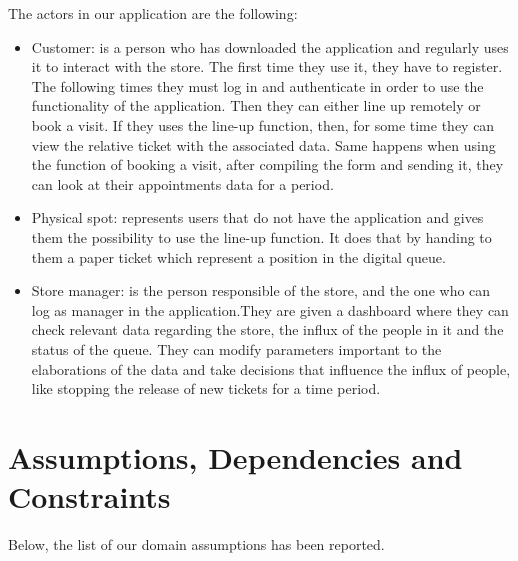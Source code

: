 The actors in our application are the following:

\begin{itemize}

	\item Customer: is a person who has downloaded the application and regularly uses it to interact with the store. The first time they use it, they have to register. The following times they must log in and authenticate in order to use the functionality of the application. Then they can either line up remotely or book a visit. If they uses the line-up function, then, for some time they can view the relative ticket with the associated data. Same happens
	when using the function of booking a visit, after compiling the form and sending it, they can look at their appointments data for a period.
	\item Physical spot: represents users that do not have the application and gives them the possibility to use the line-up function. It does that by handing to them a paper ticket which represent a position in the digital queue.
	\item Store manager: is the person responsible of the store, and the one who can log as manager in the application.They are given a dashboard where they can check relevant data regarding the store, the influx of the people in it and the status of the queue. They can modify parameters important to the elaborations of the data and take decisions that influence the influx of people, like stopping the release of new tickets for a time period. 

\end{itemize}

\section{Assumptions, Dependencies and Constraints}

Below, the list of our domain assumptions has been reported.

